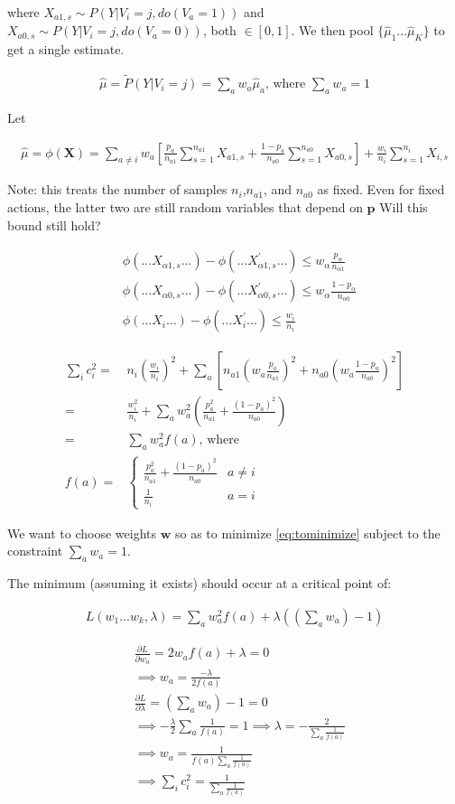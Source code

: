 \documentclass{article}
\newcommand{\eqn}[1]{\begin{align}#1\end{align}}
\theoremstyle{plain}
\theoremstyle{definition}
\begin{document}
where $X_{a1,s}  \sim P(Y|V_i = j, do(V_a = 1))$ and $X_{a0,s}  \sim P(Y|V_i = j, do(V_a = 0))$, both $\in [0,1]$. We then pool $\{\hat{\mu}_1 ... \hat{\mu}_K \}$ to get a single estimate.

\eqn {
\hat{\mu} = \tilde{P}(Y|V_i = j)= \sum_a w_a \hat{\mu}_a \text{, where } \sum_a w_a = 1
}

Let 

\eqn {
\hat{\mu} = \phi(\boldsymbol{X}) = \sum_{a \neq i} w_a \left[ 
\frac{p_a}{n_{a1}}\sum_{s=1}^{n_{a1}}X_{a1,s} + \frac{1-p_a}{n_{a0}}\sum_{s=1}^{n_{a0}}X_{a0,s}
\right] + \frac{w_i}{n_i} \sum_{s=1}^{n_i}X_{i,s}
}

Note: this treats the number of samples $n_i$,$n_{a1}$, and $n_{a0}$ as fixed. Even for fixed actions, the latter two are still random variables that depend on $\boldsymbol{p}$  Will this bound still hold?  



\eqn {
&\phi(...X_{\alpha 1,s}...) - \phi(...X_{\alpha 1,s}^{'}...) \leq w_\alpha \frac{p_\alpha}{n_{\alpha 1}} \\
&\phi(...X_{\alpha 0,s}...) - \phi(...X_{\alpha 0,s}^{'}...) \leq w_\alpha \frac{1-p_\alpha}{n_{\alpha 0}}\\
& \phi(...X_i...) - \phi(...X_i^{'}...) \leq \frac{w_i}{n_i}
}


\eqn{
\sum_i c_i^2 = & n_i \left(\frac{w_i}{n_i}\right)^2+ \sum_a \left[ n_{a1}\left(w_a \frac{p_a}{n_{a1}}\right)^2 + n_{a0}\left(w_a \frac{1-p_a}{n_{a0}}\right)^2\right]\\
= & \frac{w_i^2}{n_i}+ \sum_a w_a^2 \left(\frac{p_a^2}{n_{a1}}+  \frac{(1-p_a)^2}{n_{a0}} \right) \\
\label{eq:tominimize}
= & \sum_a w_a^2 f(a) \text{, where }\\ 
f(a) =& \begin{cases}
\frac{p_a^2}{n_{a1}}+  \frac{(1-p_a)^2}{n_{a0}}  & a \neq i\\
\frac{1}{n_i} & a = i
\end{cases}
}

We want to choose weights $\boldsymbol{w}$ so as to minimize \ref{eq:tominimize} subject to the constraint $\sum_a w_a = 1$.


The minimum (assuming it exists) should occur at a critical point of:

\eqn {
L(w_1...w_k,\lambda) = \sum_a w_a^2 f(a) + \lambda((\sum_a w_a)-1)
}

\eqn{
& \frac{\partial L}{\partial w_a}  = 2 w_a f(a) + \lambda = 0 \\
& \implies w_a =  \frac{-\lambda}{2 f(a)}\\
& \frac{\partial L}{\partial \lambda}  = (\sum_a w_a)-1= 0 \\
& \implies -\frac{\lambda}{2}\sum_a \frac{1}{f(a)} = 1
 \implies \lambda = -\frac{2}{\sum_a \frac{1}{f(a)}}\\
& \implies w_a = \frac{1}{f(a)\sum_a \frac{1}{f(a)}} \\
\label{eqn:sumofsquares}
& \implies \sum_i c_i^2 = \frac{1}{\sum_a \frac{1}{f(a)}} 
}
\end{document}
